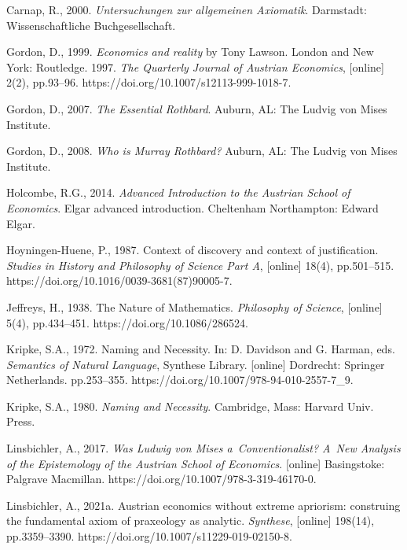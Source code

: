 Carnap, R., 2000. \textit{Untersuchungen zur allgemeinen Axiomatik}. Darmstadt: Wissenschaftliche Buchgesellschaft.



Gordon, D., 1999. \textit{Economics and reality} by Tony Lawson. London and New York: Routledge. 1997. \textit{The Quarterly Journal of Austrian Economics}, [online] 2(2), pp.93–96. https://doi.org/10.1007/s12113-999-1018-7.



Gordon, D., 2007. \textit{The Essential Rothbard}. Auburn, AL: The Ludvig von Mises Institute.



Gordon, D., 2008. \textit{Who is Murray Rothbard?} Auburn, AL: The Ludvig von Mises Institute.



Holcombe, R.G., 2014. \textit{Advanced Introduction to the Austrian School of Economics}. Elgar advanced introduction. Cheltenham Northampton: Edward Elgar.



Hoyningen-Huene, P., 1987. Context of discovery and context of justification. \textit{Studies in History and Philosophy of Science Part A}, [online] 18(4), pp.501–515. https://doi.org/10.1016/0039-3681(87)90005-7.



Jeffreys, H., 1938. The Nature of Mathematics. \textit{Philosophy of Science}, [online] 5(4), pp.434–451. https://doi.org/10.1086/286524.



Kripke, S.A., 1972. Naming and Necessity. In: D. Davidson and G. Harman, eds. \textit{Semantics of Natural Language}, Synthese Library. [online] Dordrecht: Springer Netherlands. pp.253–355. https://doi.org/10.1007/978-94-010-2557-7\_9.



Kripke, S.A., 1980. \textit{Naming and Necessity}. Cambridge, Mass: Harvard Univ. Press.



Linsbichler, A., 2017. \textit{Was Ludwig von Mises a~Conventionalist? A~New Analysis of the Epistemology of the Austrian School of Economics}. [online] Basingstoke: Palgrave Macmillan. https://doi.org/10.1007/978-3-319-46170-0.



Linsbichler, A., 2021a. Austrian economics without extreme apriorism: construing the fundamental axiom of praxeology as analytic. \textit{Synthese}, [online] 198(14), pp.3359–3390. https://doi.org/10.1007/s11229-019-02150-8.



